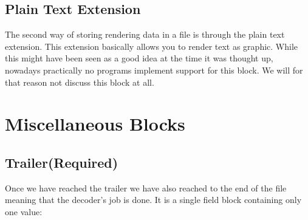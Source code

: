 \begin{algorithm}[H]
\begin{algorithmic}[1]
    \EndIf

    \Else
    \EndIf

    \State {}



    \State {}



    \EndIf
    \EndIf



    \EndWhile

  \end{algorithmic}
\end{algorithm}

\subsection{Plain Text Extension}

The second way of storing rendering data in a \gif file is through the
plain text extension. This extension basically allows you to render
text as graphic. While this might have been seen as a good idea at the
time it was thought up, nowadays practically no programs implement
support for this block. We will for that reason not discuss this
block at all.

\section{Miscellaneous Blocks}

\subsection{Trailer(Required)}

Once we have reached the trailer we have also reached to the end of
the \gif file meaning that the decoder's job is done. It is a single
field block containing only one value:

